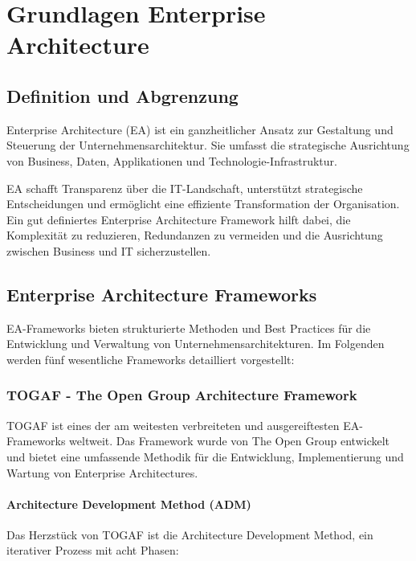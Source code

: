 \section{Grundlagen Enterprise Architecture}
\label{sec:grundlagen}

\subsection{Definition und Abgrenzung}
\label{subsec:definition}

Enterprise Architecture (EA) ist ein ganzheitlicher Ansatz zur Gestaltung und Steuerung der Unternehmensarchitektur. Sie umfasst die strategische Ausrichtung von Business, Daten, Applikationen und Technologie-Infrastruktur.

EA schafft Transparenz über die IT-Landschaft, unterstützt strategische Entscheidungen und ermöglicht eine effiziente Transformation der Organisation. Ein gut definiertes Enterprise Architecture Framework hilft dabei, die Komplexität zu reduzieren, Redundanzen zu vermeiden und die Ausrichtung zwischen Business und IT sicherzustellen.

\subsection{Enterprise Architecture Frameworks}
\label{subsec:frameworks}

EA-Frameworks bieten strukturierte Methoden und Best Practices für die Entwicklung und Verwaltung von Unternehmensarchitekturen. Im Folgenden werden fünf wesentliche Frameworks detailliert vorgestellt:

\subsubsection{TOGAF - The Open Group Architecture Framework}
\label{subsubsec:togaf}

TOGAF ist eines der am weitesten verbreiteten und ausgereiftesten EA-Frameworks weltweit. Das Framework wurde von The Open Group entwickelt und bietet eine umfassende Methodik für die Entwicklung, Implementierung und Wartung von Enterprise Architectures.

\paragraph{Architecture Development Method (ADM)}
Das Herzstück von TOGAF ist die Architecture Development Method, ein iterativer Prozess mit acht Phasen:

